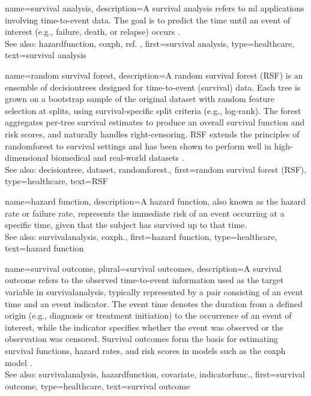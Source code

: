 {name={survival analysis},
 description={A  survival analysis refers to \gls{ml} applications 
              involving time-to-event \gls{data}. The goal is to predict the time until an 
               event of interest (e.g., failure, death, or relapse) occurs \cite{Wang2019_2025}. \\
    See also: \gls{hazardfunction}, \gls{coxph}, \gls{rsf}.
  },
  first={survival analysis},
  type=healthcare,
  text={survival analysis}
}

{name={random survival forest},
  description={A random survival forest (RSF) 
        \cite{Ishwaran2008} is an ensemble of \glspl{decisiontree} designed for 
        time-to-event (survival) \gls{data}. Each tree is grown on a \gls{bootstrap} 
        sample of the original \gls{dataset} with random \gls{feature} selection 
        at splits, using survival-specific split criteria (e.g., log-rank). 
       The forest aggregates per-tree survival estimates to produce an overall 
       survival function and risk scores, and naturally handles right-censoring.
       RSF extends the principles of \gls{randomforest} to survival settings and 
       has been shown to perform well in high-dimensional biomedical and real-world \glspl{dataset}
    \cite{Wang2019,Salerno2023}.
    \\
    See also: \gls{decisiontree}, \gls{dataset}, \gls{randomforest}.},
  first={random survival forest (RSF)},
  type=healthcare,
  text={RSF}
}

{name={hazard function},
  description={A hazard function, also known as the 
               hazard rate or failure rate, represents the immediate risk 
               of an event occurring at a specific time, given that the 
               subject has survived up to that time. 
    \\
    See also: \gls{survivalanalysis}, \gls{coxph}.},
  first={hazard function},
  type=healthcare,
  text={hazard function}
}


{name={survival outcome}, 
 plural={survival outcomes},
 description={A survival outcome refers to 
               the observed time-to-event information used as the \gls{target} 
               variable in \gls{survivalanalysis}, typically represented by a 
               pair consisting of an event time and an event indicator. The event 
               time denotes the duration from a defined origin (e.g., diagnosis 
               or treatment initiation) to the occurrence of an event of interest, 
               while the indicator specifies whether the event was observed or the 
               observation was censored. Survival outcomes form the basis for estimating 
               survival functions, hazard rates, and risk scores in \glspl{model} 
               such as the \gls{coxph} \gls{model} \cite{Cox1972,Kleinbaum2012}.
  \\
  See also: \gls{survivalanalysis}, \gls{hazardfunction}, \gls{covariate}, \gls{indicatorfunc}.},
  first={survival outcome},
  type=healthcare,
  text={survival outcome}
}



